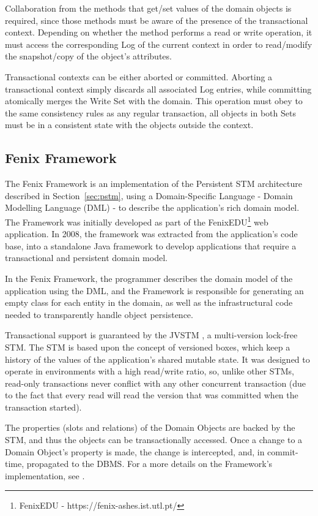 \documentclass{llncs}
\begin{document}
Collaboration from the methods that get/set values of the domain
objects is required, since those methods must be aware of the presence
of the transactional context. Depending on whether the method performs
a read or write operation, it must access the corresponding Log of the
current context in order to read/modify the snapshot/copy of the
object's attributes.

Transactional contexts can be either aborted or committed. Aborting a
transactional context simply discards all associated Log entries,
while committing atomically merges the Write Set with the domain. This
operation must obey to the same consistency rules as any regular
transaction, all objects in both Sets must be in a consistent state
with the objects outside the context.

\subsection{Fenix Framework}

The Fenix Framework \cite{fernandes2011strict} is an implementation of
the Persistent STM architecture described in Section~\ref{sec:pstm},
using a Domain-Specific Language - Domain Modelling Language (DML)
\cite{cachopo2007development} - to describe the application's rich
domain model. The Framework was initially developed as part of the
FenixEDU\footnote{FenixEDU - https://fenix-ashes.ist.utl.pt/} web
application. In 2008, the framework was extracted from the
application's code base, into a standalone Java framework to develop
applications that require a transactional and persistent domain model.

In the Fenix Framework, the programmer describes the domain model of
the application using the DML, and the Framework is responsible for
generating an empty class for each entity in the domain, as well as
the infrastructural code needed to transparently handle object
persistence.

Transactional support is guaranteed by the JVSTM
\cite{cachopo2006versioned}, a multi-version lock-free STM. The STM is
based upon the concept of versioned boxes, which keep a history of the
values of the application's shared mutable state. It was designed to
operate in environments with a high read/write ratio, so, unlike other
STMs, read-only transactions never conflict with any other concurrent
transaction (due to the fact that every read will read the version
that was committed when the transaction started).

The properties (slots and relations) of the Domain Objects are backed
by the STM, and thus the objects can be transactionally accessed. Once
a change to a Domain Object's property is made, the change is
intercepted, and, in commit-time, propagated to the DBMS. For a more
details on the Framework's implementation, see
\cite{fernandes2011strict}.
\end{document}
